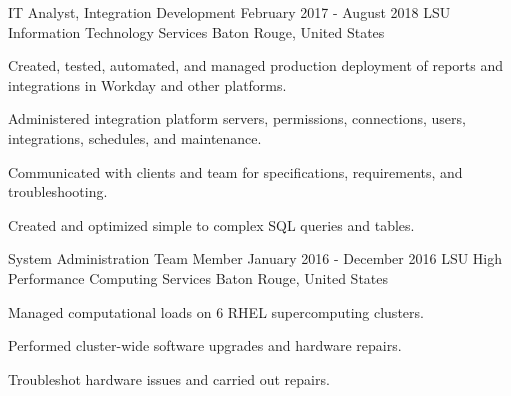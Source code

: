 \begin{cventries}
	\cventry
	{IT Analyst, Integration Development} %
	{February 2017 - August 2018} %
	{LSU Information Technology Services} %
	{Baton Rouge, United States} %
	{
	\begin{cvitems} %
		\item {Created, tested, automated, and managed production deployment of reports and integrations in Workday and other platforms.}
		\item {Administered integration platform servers, permissions, connections, users, integrations, schedules, and maintenance.}
		\item {Communicated with clients and team for specifications, requirements, and troubleshooting.}
		\item {Created and optimized simple to complex SQL queries and tables.}
	\end{cvitems}
	}  

	\cventry
	{System Administration Team Member} %
	{January 2016 - December 2016} %
	{LSU High Performance Computing Services} %
	{Baton Rouge, United States} %
	{
	\begin{cvitems} %
		\item {Managed computational loads on 6 RHEL supercomputing clusters.}
		\item {Performed cluster-wide software upgrades and hardware repairs.}
		\item {Troubleshot hardware issues and carried out repairs.}
	\end{cvitems}
	}

\end{cventries}
